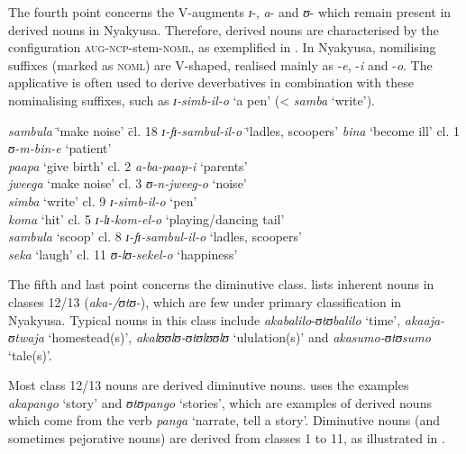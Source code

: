 \documentclass[output=paper]{langscibook}
\begin{document}
The fourth point concerns the V-aug\-ments \textit{ɪ}{}-, \textit{a}{}- and \textit{ʊ}{}- which remain present in derived nouns in Nyakyusa. Therefore, derived nouns are characterised by the configuration \textsc{aug-ncp}-stem-\textsc{noml}, as exemplified in . In Nyakyusa, nomilising suffixes (marked as \textsc{noml}) are V-shaped, realised mainly as -\textit{e}, -\textit{i} and -\textit{o}. The applicative is often used to derive deverbatives in combination with these nominalising suffixes, such as \textit{ɪ{}-simb-il-o} ‘a pen’ (< \textit{samba} ‘write’). 

\ea%
    \label{ex:lusekelo:8}
    \begin{tabbing}
    \textit{sambula} \= ‘make noise’ \= cl. 18  \= \textit{ɪ{}-fɪ{}-sambul-il-o} \= ‘ladles, scoopers’\kill
  \textit{bina} \> ‘become ill’ \> cl. 1 \> \textit{ʊ{}-m-bin-e} \> ‘patient’\\
  \textit{paapa} \> ‘give birth’ \> cl. 2 \> \textit{a-ba-paap-i} \> ‘parents’\\
  \textit{jwee}{\textit{g}}\textit{a} \> ‘make noise’ \> cl. 3 \> \textit{ʊ{}-n-jwee}{\textit{g}}\textit{{}-o} \> ‘noise’\\
  \textit{simba} \> ‘write’ \> cl. 9 \> \textit{ɪ{}-simb-il-o} \> ‘pen’ \\
  \textit{koma} \> ‘hit’ \> cl. 5 \> \textit{ɪ{}-lɪ{}-kom-el-o} \> ‘playing/dancing tail’ \\
  \textit{sambula} \> ‘scoop’ \> cl. 8 \> \textit{ɪ{}-fɪ{}-sambul-il-o} \> ‘ladles, scoopers’\\
  \textit{seka} \> ‘laugh’ \> cl. 11 \> \textit{ʊ{}-lʊ{}-sekel-o} \> ‘happiness’
\end{tabbing}
\z

\begin{sloppypar}
The fifth and last point concerns the diminutive class. \citet[3--5]{Felberg1996} lists inherent nouns in classes 12/13 (\textit{aka-/ʊtʊ{}-}), which are few under primary classification in Nyakyusa. Typical nouns in this class include \textit{akabalilo}{}-\textit{ʊtʊbalilo} ‘time’, \textit{akaaja-ʊtwaja} ‘homestead(s)’, \textit{akalʊʊlʊ{}-ʊtʊlʊʊlʊ} ‘ululation(s)’ and \textit{akasumo-ʊtʊsumo} ‘tale(s)’. 
\end{sloppypar}

Most class 12/13 nouns are derived diminutive nouns. \citet[43]{Persohn2017} uses the examples \textit{akapango} ‘story’ and \textit{ʊtʊpango} ‘stories’, which are examples of derived nouns which come from the verb \textit{panga} ‘narrate, tell a story’. Diminutive nouns (and sometimes pejorative nouns) are derived from classes 1 to 11, as illustrated in . 
\end{document}
